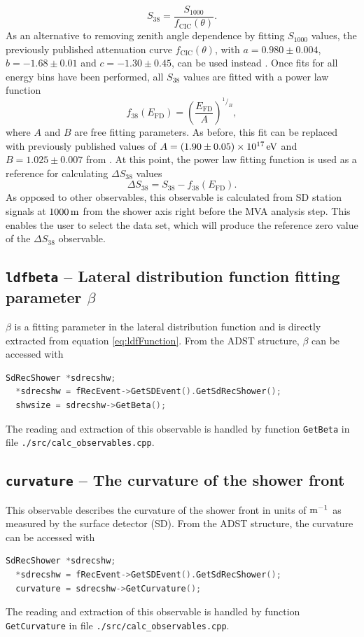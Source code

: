 \documentclass[12pt,a4paper]{report}
\newcommand*\rfrac[2]{{}^{#1}\!/_{#2}}	%
\begin{document}
\begin{equation}\label{eq:s1000tos38}
S_{38} = \frac{S_{1000}}{f_{\textrm{CIC}}(\theta)}.
\end{equation}
As an alternative to removing zenith angle dependence by fitting $S_{1000}$ values, the previously published attenuation curve $f_{\textrm{CIC}}(\theta)$, with $a = 0.980\pm 0.004$, $b = -1.68\pm 0.01$ and $c = -1.30\pm 0.45$, can be used instead \cite{fcicICRC2013}. Once fits for all energy bins have been performed, all $S_{38}$ values are fitted with a power law function
\begin{equation}\label{eq:powerlawfit}
f_{38}(E_{\textrm{FD}}) = \left(\frac{E_{\textrm{FD}}}{A}\right)^{\rfrac{1}{B}},
\end{equation}
where $A$ and $B$ are free fitting parameters. As before, this fit can be replaced with previously published values of $A = \unit[(1.90\pm 0.05)\times 10^{17}]{eV}$ and $B = 1.025\pm 0.007$ from \cite{fcicICRC2013}. At this point, the power law fitting function is used as a reference for calculating $\Delta S_{38}$ values
\begin{equation}
\Delta S_{38} = S_{38} - f_{38}(E_{\textrm{FD}}).
\end{equation}
As opposed to other observables, this observable is calculated from SD station signals at $\unit[1000]{m}$ from the shower axis right before the MVA analysis step. This enables the user to select the data set, which will produce the reference zero value of the $\Delta S_{38}$ observable.

\subsection{\texttt{ldfbeta} -- Lateral distribution function fitting parameter $\beta$}
$\beta$ is a fitting parameter in the lateral distribution function and is directly extracted from equation \eqref{eq:ldfFunction}. From the ADST structure, $\beta$ can be accessed with
\begin{lstlisting}[language=C++]
  SdRecShower *sdrecshw;
  *sdrecshw = fRecEvent->GetSDEvent().GetSdRecShower();
  shwsize = sdrecshw->GetBeta();
\end{lstlisting}
The reading and extraction of this observable is handled by function \texttt{GetBeta} in file \texttt{./src/calc\_observables.cpp}.

\subsection{\texttt{curvature} -- The curvature of the shower front}
This observable describes the curvature of the shower front in units of $\unit[]{m^{-1}}$ as measured by the surface detector (SD). From the ADST structure, the curvature can be accessed with
\begin{lstlisting}[language=C++]
  SdRecShower *sdrecshw;
  *sdrecshw = fRecEvent->GetSDEvent().GetSdRecShower();
  curvature = sdrecshw->GetCurvature();
\end{lstlisting}
The reading and extraction of this observable is handled by function \texttt{GetCurvature} in file \texttt{./src/calc\_observables.cpp}.
\end{document}
